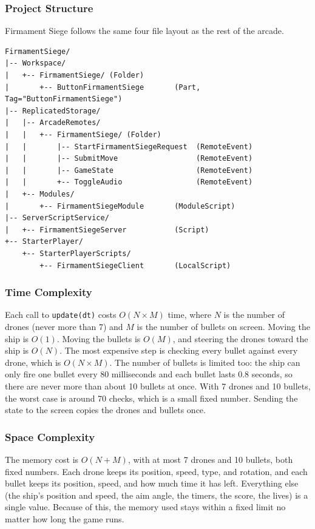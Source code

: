 \documentclass[12pt,letterpaper]{article}
\begin{document}
\subsubsection{Project Structure}

Firmament Siege follows the same four file layout as the rest of the arcade.

\begin{lstlisting}
FirmamentSiege/
|-- Workspace/
|   +-- FirmamentSiege/ (Folder)
|       +-- ButtonFirmamentSiege       (Part, Tag="ButtonFirmamentSiege")
|-- ReplicatedStorage/
|   |-- ArcadeRemotes/
|   |   +-- FirmamentSiege/ (Folder)
|   |       |-- StartFirmamentSiegeRequest  (RemoteEvent)
|   |       |-- SubmitMove                  (RemoteEvent)
|   |       |-- GameState                   (RemoteEvent)
|   |       +-- ToggleAudio                 (RemoteEvent)
|   +-- Modules/
|       +-- FirmamentSiegeModule       (ModuleScript)
|-- ServerScriptService/
|   +-- FirmamentSiegeServer           (Script)
+-- StarterPlayer/
    +-- StarterPlayerScripts/
        +-- FirmamentSiegeClient       (LocalScript)
\end{lstlisting}

\subsubsection{Time Complexity}

Each call to \texttt{update(dt)} costs $O(N \times M)$ time, where $N$ is the number of drones (never more than 7) and $M$ is the number of bullets on screen. Moving the ship is $O(1)$. Moving the bullets is $O(M)$, and steering the drones toward the ship is $O(N)$. The most expensive step is checking every bullet against every drone, which is $O(N \times M)$. The number of bullets is limited too: the ship can only fire one bullet every 80 milliseconds and each bullet lasts 0.8 seconds, so there are never more than about 10 bullets at once. With 7 drones and 10 bullets, the worst case is around 70 checks, which is a small fixed number. Sending the state to the screen copies the drones and bullets once.

\subsubsection{Space Complexity}

The memory cost is $O(N + M)$, with at most 7 drones and 10 bullets, both fixed numbers. Each drone keeps its position, speed, type, and rotation, and each bullet keeps its position, speed, and how much time it has left. Everything else (the ship's position and speed, the aim angle, the timers, the score, the lives) is a single value. Because of this, the memory used stays within a fixed limit no matter how long the game runs.
\end{document}
